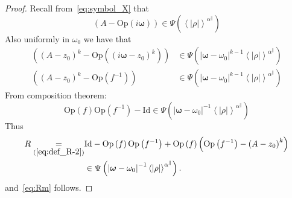 \documentclass[AHL,Unicode,longabstracts,published]{cedram}
\newcommand*\eq[1]{\underset{(#1)}{=}}
\newcommand{\Opp}{\mathrm{Op}}
\newcommand{\Id}{\mathrm{Id}}
\begin{document}
\begin{proof}
Recall from~\eqref{eq:symbol_X} that
\[
\left(A-\Opp \left(i\boldsymbol{\omega}\right)\right)\in\Psi\left(\left\langle \left|\rho\right|\right\rangle ^{\alpha^{\parallel}}\right)
\]
Also uniformly in $\omega_{0}$ we have that
\begin{align*}
\left(\left(A-z_{0}\right)^{k}-\Opp \left(\left(i\boldsymbol{\omega}-z_{0}\right)^{k}\right)\right) &\in\Psi\left(\left|\boldsymbol{\omega}-\omega_{0}\right|^{k-1}\left\langle \left|\rho\right|\right\rangle ^{\alpha^{\parallel}}\right)
\\
\left(\left(A-z_{0}\right)^{k}-\Opp \left(f^{-1}\right)\right)&\in\Psi\left(\left|\boldsymbol{\omega}-\omega_{0}\right|^{k-1}\left\langle \left|\rho\right|\right\rangle ^{\alpha^{\parallel}}\right)
\end{align*}
From composition theorem:
\[
\Opp \left(f\right)\Opp \left(f^{-1}\right)-\Id \in\Psi\left(\left|\boldsymbol{\omega}-\omega_{0}\right|^{-1}\left\langle \left|\rho\right|\right\rangle ^{\alpha^{\parallel}}\right)
\]
Thus
\begin{align*}
R  \eq{\ref{eq:def_R-2}}&\Id -\Opp \left(f\right)\Opp \left(f^{-1}\right)+\Opp \left(f\right)\left(\Opp \left(f^{-1}\right)-\left(A-z_{0}\right)^{k}\right)\\
& \in\Psi\left(\left|\boldsymbol{\omega}-\omega_{0}\right|^{-1}\left\langle \left|\rho\right|\right\rangle ^{\alpha^{\parallel}}\right).
\end{align*}
and~\eqref{eq:Rm} follows.
\end{proof}
\end{document}
